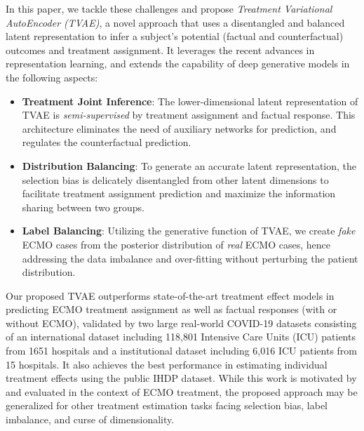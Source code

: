 In this paper, we tackle these challenges and propose \textit{Treatment Variational AutoEncoder (TVAE)}, a novel approach that uses a disentangled and balanced latent representation to infer a subject’s potential (factual and counterfactual) outcomes and treatment assignment. It leverages the recent advances in representation learning, and extends the capability of deep generative models in the following aspects:
\begin{itemize}
\item \textbf{Treatment Joint Inference}: The lower-dimensional latent representation of TVAE is \textit{semi-supervised} by treatment assignment and factual response. This architecture eliminates the need of auxiliary networks for prediction, and regulates the counterfactual prediction.  
\item \textbf{Distribution Balancing}: To generate an accurate latent representation, the selection bias is delicately disentangled from other latent dimensions to facilitate treatment assignment prediction and maximize the information sharing between two groups. 
\item \textbf{Label Balancing}: Utilizing the generative function of TVAE, we create \textit{fake} ECMO cases from the posterior distribution of \textit{real} ECMO cases, hence addressing the data imbalance and over-fitting without perturbing the patient distribution. 
\end{itemize}

  Our proposed TVAE outperforms state-of-the-art treatment effect models in predicting ECMO treatment assignment as well as factual responses (with or without ECMO), validated by two large real-world COVID-19 datasets consisting of an international dataset including 118,801 Intensive Care Units (ICU) patients from 1651 hospitals and a institutional dataset including 6,016 ICU patients from 15 hospitals. It also achieves the best performance in estimating individual treatment effects using the public IHDP dataset. While this work is motivated by and evaluated in the context of ECMO treatment, the proposed approach may be generalized for other treatment estimation tasks facing selection bias, label imbalance, and curse of dimensionality.



